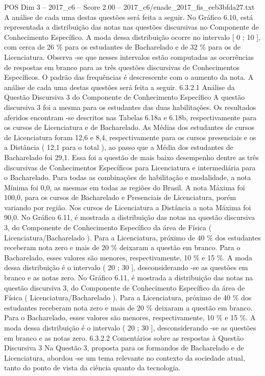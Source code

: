 \begin{textsample}{POS Dim 3 – 2017\_c6 – Score 2.00 – 2017\_c6/enade\_2017\_fis\_eeb3bfda27.txt}
A análise de cada uma destas questões será feita a seguir.
No Gráfico 6.10, está representada a distribuição das notas nas questões discursivas no Componente de Conhecimento Específico.
A moda dessa distribuição ocorre no intervalo [ 0 ; 10 ], com cerca de 26 \% para os estudantes de Bacharelado e de 32 \% para os de Licenciatura.
Observa -se que nesses intervalos estão computadas as ocorrências de respostas em branco para as três questões discursivas de Conhecimentos Específicos.
O padrão das frequências é descrescente com o aumento da nota.
A análise de cada uma destas questões será feita a seguir. 6.3.2.1 Análise da Questão Discursiva 3 do Componente de Conhecimento Específico A questão discursiva 3 foi a mesma para os estudantes das duas habilitações.
Os resultados aferidos encontram -se descritos nas Tabelas 6.18a e 6.18b, respectivamente para os cursos de Licenciatura e de Bacharelado.
As Médias dos estudantes de cursos de Licenciatura foram 12,6 e 8,4, respectivamente para os cursos presenciais e os a Distância ( 12,1 para o total ), ao passo que a Média dos estudantes de Bacharelado foi 29,1.
Essa foi a questão de mais baixo desempenho dentre as três discursivas de Conhecimentos Específicos para Licenciatura e intermediária para o Bacharelado.
Para todas as combinações de habilitação e modalidade, a nota Mínima foi 0,0, as mesmas em todas as regiões do Brasil.
A nota Máxima foi 100,0, para os cursos de Bacharelado e Presenciais de Licenciatura, porém variando por região.
Nos cursos de Licenciatura a Distância a nota Máxima foi 90,0.
No Gráfico 6.11, é mostrada a distribuição das notas na questão discursiva 3, do Componente de Conhecimento Específico da área de Física ( Licenciatura/Bacharelado ).
Para a Licenciatura, próximo de 40 \% dos estudantes receberam nota zero e mais de 20 \% deixaram a questão em branco.
Para o Bacharelado, esses valores são menores, respectivamente, 10 \% e 15 \%.
A moda dessa distribuição é o intervalo ( 20 ; 30 ], desconsiderando -se as questões em branco e as notas zero.
No Gráfico 6.11, é mostrada a distribuição das notas na questão discursiva 3, do Componente de Conhecimento Específico da área de Física ( Licenciatura/Bacharelado ).
Para a Licenciatura, próximo de 40 \% dos estudantes receberam nota zero e mais de 20 \% deixaram a questão em branco.
Para o Bacharelado, esses valores são menores, respectivamente, 10 \% e 15 \%.
A moda dessa distribuição é o intervalo ( 20 ; 30 ], desconsiderando -se as questões em branco e as notas zero. 6.3.2.2 Comentários sobre as respostas à Questão Discursiva 3 Na Questão 3, proposta para os formandos de Bacharelado e de Licenciatura, abordou -se um tema relevante no contexto da sociedade atual, tanto do ponto de vista da ciência quanto da tecnologia.

\end{textsample}
